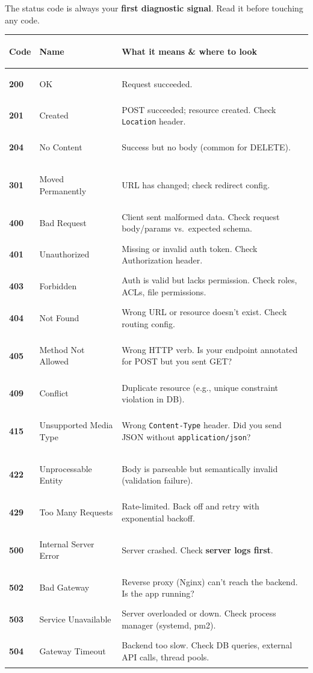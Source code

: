 \documentclass[11pt, letterpaper]{article}
\begin{document}
The status code is always your \textbf{first diagnostic signal}. Read it before touching any code.

\noindent
{\renewcommand{\arraystretch}{1.5}
\begin{tabularx}{\textwidth}{>{\bfseries\centering\arraybackslash}p{1.2cm}
                              >{\bfseries\raggedright\arraybackslash}p{3.8cm}
                              >{\raggedright\arraybackslash}X}
\toprule
\rowcolor{tableheaderred}
\textbf{Code} & \textbf{Name} & \textbf{What it means \& where to look} \\
\midrule
\rowcolor{rowA}  200 & OK                    & Request succeeded. \\
\rowcolor{rowRe} 201 & Created               & POST succeeded; resource created. Check \texttt{Location} header. \\
\rowcolor{rowA}  204 & No Content            & Success but no body (common for DELETE). \\
\rowcolor{rowRe} 301 & Moved Permanently     & URL has changed; check redirect config. \\
\rowcolor{rowA}  400 & Bad Request           & Client sent malformed data. Check request body/params vs.\ expected schema. \\
\rowcolor{rowRe} 401 & Unauthorized          & Missing or invalid auth token. Check Authorization header. \\
\rowcolor{rowA}  403 & Forbidden             & Auth is valid but lacks permission. Check roles, ACLs, file permissions. \\
\rowcolor{rowRe} 404 & Not Found             & Wrong URL or resource doesn't exist. Check routing config. \\
\rowcolor{rowA}  405 & Method Not Allowed    & Wrong HTTP verb. Is your endpoint annotated for POST but you sent GET? \\
\rowcolor{rowRe} 409 & Conflict              & Duplicate resource (e.g., unique constraint violation in DB). \\
\rowcolor{rowA}  415 & Unsupported Media Type & Wrong \texttt{Content-Type} header. Did you send JSON without \texttt{application/json}? \\
\rowcolor{rowRe} 422 & Unprocessable Entity  & Body is parseable but semantically invalid (validation failure). \\
\rowcolor{rowA}  429 & Too Many Requests     & Rate-limited. Back off and retry with exponential backoff. \\
\rowcolor{rowRe} 500 & Internal Server Error & Server crashed. Check \textbf{server logs first}. \\
\rowcolor{rowA}  502 & Bad Gateway           & Reverse proxy (Nginx) can't reach the backend. Is the app running? \\
\rowcolor{rowRe} 503 & Service Unavailable   & Server overloaded or down. Check process manager (systemd, pm2). \\
\rowcolor{rowA}  504 & Gateway Timeout       & Backend too slow. Check DB queries, external API calls, thread pools. \\
\bottomrule
\end{tabularx}}
\end{document}
